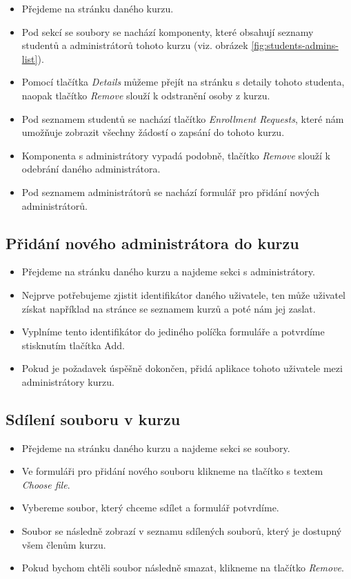  \begin{itemize}
	\item Přejdeme na stránku daného kurzu.
	\item Pod sekcí se soubory se nachází komponenty, které obsahují seznamy studentů a administrátorů tohoto kurzu (viz. obrázek \ref{fig:students-admins-list}). 
	\item Pomocí tlačítka \textit{Details} můžeme přejít na stránku s detaily tohoto studenta, naopak tlačítko \textit{Remove} slouží k odstranění osoby z kurzu.
	\item Pod seznamem studentů se nachází tlačítko \textit{Enrollment Requests}, které nám umožňuje zobrazit všechny žádostí o zapsání do tohoto kurzu.
	\item Komponenta s administrátory vypadá podobně, tlačítko \textit{Remove} slouží k odebrání daného administrátora.
	\item Pod seznamem administrátorů se nachází formulář pro přidání nových administrátorů.
\end{itemize}

\subsection{Přidání nového administrátora do kurzu}

\begin{itemize}
	\item Přejdeme na stránku daného kurzu a najdeme sekci s administrátory.
	\item Nejprve potřebujeme zjistit identifikátor daného uživatele, ten může uživatel získat například na stránce se seznamem kurzů a poté nám jej zaslat.
	\item Vyplníme tento identifikátor do jediného políčka formuláře a potvrdíme stisknutím tlačítka Add.
	\item Pokud je požadavek úspěšně dokončen, přidá aplikace tohoto uživatele mezi administrátory kurzu.
\end{itemize}

\subsection{Sdílení souboru v kurzu}
\begin{itemize}
	\item Přejdeme na stránku daného kurzu a najdeme sekci se soubory.
	\item Ve formuláři pro přidání nového souboru klikneme na tlačítko s textem \textit{Choose file}.
	\item Vybereme soubor, který chceme sdílet a formulář potvrdíme.
	\item Soubor se následně zobrazí v seznamu sdílených souborů, který je dostupný všem členům kurzu.
	\item Pokud bychom chtěli soubor následně smazat, klikneme na tlačítko \textit{Remove}.
\end{itemize}

